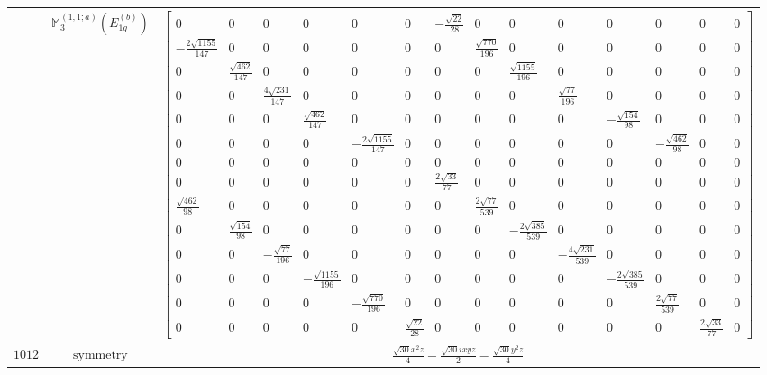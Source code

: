 \documentclass[fleqn,8pt,landscape]{jsarticle}
\begin{document}
\begin{longtable}{ccc}
$  $ & $ \mathbb{M}_{3}^{(1,1;a)}(E_{1g}^{(b)}) $ & $ \begin{bmatrix} 0 & 0 & 0 & 0 & 0 & 0 & - \frac{\sqrt{22}}{28} & 0 & 0 & 0 & 0 & 0 & 0 & 0 \\ - \frac{2 \sqrt{1155}}{147} & 0 & 0 & 0 & 0 & 0 & 0 & \frac{\sqrt{770}}{196} & 0 & 0 & 0 & 0 & 0 & 0 \\ 0 & \frac{\sqrt{462}}{147} & 0 & 0 & 0 & 0 & 0 & 0 & \frac{\sqrt{1155}}{196} & 0 & 0 & 0 & 0 & 0 \\ 0 & 0 & \frac{4 \sqrt{231}}{147} & 0 & 0 & 0 & 0 & 0 & 0 & \frac{\sqrt{77}}{196} & 0 & 0 & 0 & 0 \\ 0 & 0 & 0 & \frac{\sqrt{462}}{147} & 0 & 0 & 0 & 0 & 0 & 0 & - \frac{\sqrt{154}}{98} & 0 & 0 & 0 \\ 0 & 0 & 0 & 0 & - \frac{2 \sqrt{1155}}{147} & 0 & 0 & 0 & 0 & 0 & 0 & - \frac{\sqrt{462}}{98} & 0 & 0 \\ 0 & 0 & 0 & 0 & 0 & 0 & 0 & 0 & 0 & 0 & 0 & 0 & 0 & 0 \\ 0 & 0 & 0 & 0 & 0 & 0 & \frac{2 \sqrt{33}}{77} & 0 & 0 & 0 & 0 & 0 & 0 & 0 \\ \frac{\sqrt{462}}{98} & 0 & 0 & 0 & 0 & 0 & 0 & \frac{2 \sqrt{77}}{539} & 0 & 0 & 0 & 0 & 0 & 0 \\ 0 & \frac{\sqrt{154}}{98} & 0 & 0 & 0 & 0 & 0 & 0 & - \frac{2 \sqrt{385}}{539} & 0 & 0 & 0 & 0 & 0 \\ 0 & 0 & - \frac{\sqrt{77}}{196} & 0 & 0 & 0 & 0 & 0 & 0 & - \frac{4 \sqrt{231}}{539} & 0 & 0 & 0 & 0 \\ 0 & 0 & 0 & - \frac{\sqrt{1155}}{196} & 0 & 0 & 0 & 0 & 0 & 0 & - \frac{2 \sqrt{385}}{539} & 0 & 0 & 0 \\ 0 & 0 & 0 & 0 & - \frac{\sqrt{770}}{196} & 0 & 0 & 0 & 0 & 0 & 0 & \frac{2 \sqrt{77}}{539} & 0 & 0 \\ 0 & 0 & 0 & 0 & 0 & \frac{\sqrt{22}}{28} & 0 & 0 & 0 & 0 & 0 & 0 & \frac{2 \sqrt{33}}{77} & 0 \end{bmatrix} $ \\ \hline
$ 1012 $ & $ \text{symmetry} $ & $ \frac{\sqrt{30} x^{2} z}{4} - \frac{\sqrt{30} i x y z}{2} - \frac{\sqrt{30} y^{2} z}{4} $ \\

\end{longtable}
\end{document}

